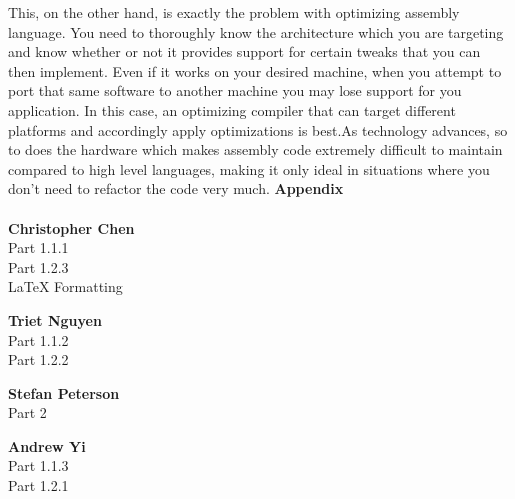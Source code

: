 \documentclass[11pt]{article}
\begin{document}
This, on the other hand, is exactly the problem with optimizing assembly language. You need to thoroughly know the architecture which you are targeting and know whether or not it provides support for certain tweaks that you can then implement. Even if it works on your desired machine, when you attempt to port that same software to another machine you may lose support for you application. In this case, an optimizing compiler that can target different platforms and accordingly apply optimizations is best.As technology advances, so to does the hardware which makes assembly code extremely difficult to maintain compared to high level languages, making it only ideal in situations where you don’t need to refactor the code very much. 
\pagebreak
\appendix
\textbf{\Large Appendix}
\\\\
\textbf{Christopher Chen}
\\Part 1.1.1
\\Part 1.2.3
\\LaTeX Formatting

\textbf{Triet Nguyen}
\\Part 1.1.2
\\Part 1.2.2

\textbf{Stefan Peterson}
\\Part 2

\textbf{Andrew Yi}
\\Part 1.1.3
\\Part 1.2.1
\end{document}
